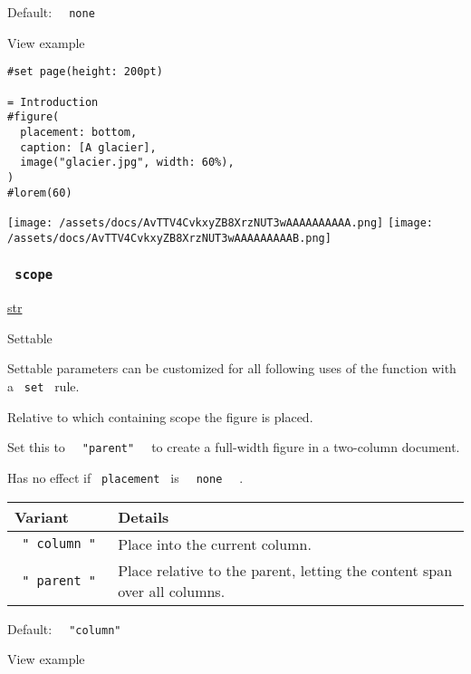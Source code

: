 Default: \texttt{\ }{\texttt{\ none\ }}\texttt{\ }


View example

\begin{verbatim}
#set page(height: 200pt)

= Introduction
#figure(
  placement: bottom,
  caption: [A glacier],
  image("glacier.jpg", width: 60%),
)
#lorem(60)
\end{verbatim}

\texttt{[image: /assets/docs/AvTTV4CvkxyZB8XrzNUT3wAAAAAAAAAA.png]}
\texttt{[image: /assets/docs/AvTTV4CvkxyZB8XrzNUT3wAAAAAAAAAB.png]}

\subsubsection{\texorpdfstring{\texttt{\ scope\ }}{ scope }}\label{parameters-scope}

\href{/docs/reference/foundations/str/}{str}

{{ Settable }}

\label{parameters-scope-settable-tooltip}
Settable parameters can be customized for all following uses of the
function with a \texttt{\ set\ } rule.

Relative to which containing scope the figure is placed.

Set this to \texttt{\ }{\texttt{\ "parent"\ }}\texttt{\ } to create a
full-width figure in a two-column document.

Has no effect if \texttt{\ placement\ } is
\texttt{\ }{\texttt{\ none\ }}\texttt{\ } .

\begin{longtable}[]{@{}ll@{}}
\toprule\noalign{}
Variant & Details \\
\midrule\noalign{}
\endhead
\bottomrule\noalign{}
\endlastfoot
\texttt{\ "\ column\ "\ } & Place into the current column. \\
\texttt{\ "\ parent\ "\ } & Place relative to the parent, letting the
content span over all columns. \\
\end{longtable}

Default: \texttt{\ }{\texttt{\ "column"\ }}\texttt{\ }


View example

